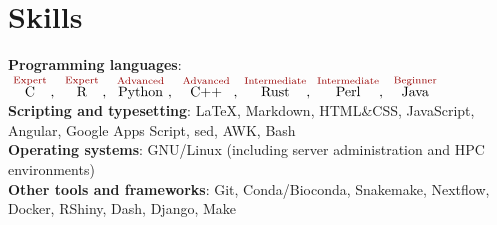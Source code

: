 \documentclass[letterpaper,10.5pt]{article}
\begin{document}

\section{Skills}

\textbf{Programming languages}:
$\overset{\textcolor{isored}{\text{   Expert   }}}{\text{C}},\ \overset{\textcolor{isored}{\text{   Expert   }}}{\text{R}},\
\overset{\textcolor{isored}{\text{  Advanced  }}}{\text{Python}},\ \overset{\textcolor{isored}{\text{  Advanced  }}}{\text{C++}},\
\overset{\textcolor{isored}{\text{Intermediate}}}{\text{Rust}},\
\overset{\textcolor{isored}{\text{Intermediate}}}{\text{Perl}},\  
\overset{\textcolor{isored}{\text{  Beginner  }}}{\text{Java}}$ \\
\smallskip
\textbf{Scripting and typesetting}: \LaTeX, Markdown, HTML\&CSS, JavaScript, Angular, Google Apps Script, sed, AWK, Bash \\
\smallskip
\textbf{Operating systems}: GNU/Linux (including server administration and HPC environments) \\
\smallskip
\textbf{Other tools and frameworks}: Git,  Conda/Bioconda, Snakemake, Nextflow, Docker, RShiny, Dash, Django, Make \smallskip


\end{document}
